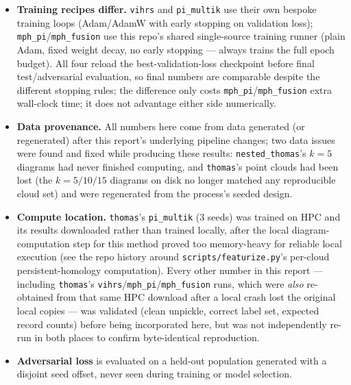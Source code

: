 \documentclass[11pt]{article}
\begin{document}
\begin{itemize}
  \item \textbf{Training recipes differ.} \texttt{vihrs} and \texttt{pi\_multik}
    use their own bespoke training loops (Adam/AdamW with early stopping on
    validation loss); \texttt{mph\_pi}/\texttt{mph\_fusion} use this repo's shared
    single-source training runner (plain Adam, fixed weight decay, no early
    stopping --- always trains the full epoch budget). All four reload the
    best-validation-loss checkpoint before final test/adversarial evaluation, so
    final numbers are comparable despite the different stopping rules; the
    difference only costs \texttt{mph\_pi}/\texttt{mph\_fusion} extra wall-clock
    time; it does not advantage either side numerically.
  \item \textbf{Data provenance.} All numbers here come from data generated (or
    regenerated) after this report's underlying pipeline changes; two data issues
    were found and fixed while producing these results: \texttt{nested\_thomas}'s
    $k=5$ diagrams had never finished computing, and \texttt{thomas}'s point
    clouds had been lost (the $k=5/10/15$ diagrams on disk no longer matched any
    reproducible cloud set) and were regenerated from the process's seeded design.
  \item \textbf{Compute location.} \texttt{thomas}'s \texttt{pi\_multik} (3
    seeds) was trained on HPC and its results downloaded rather than trained
    locally, after the local diagram-computation step for this method proved too
    memory-heavy for reliable local execution (see the repo history around
    \texttt{scripts/featurize.py}'s per-cloud persistent-homology computation).
    Every other number in this report --- including \texttt{thomas}'s
    \texttt{vihrs}/\texttt{mph\_pi}/\texttt{mph\_fusion} runs, which were
    \emph{also} re-obtained from that same HPC download after a local crash lost
    the original local copies --- was validated (clean unpickle, correct label
    set, expected record counts) before being incorporated here, but was not
    independently re-run in both places to confirm byte-identical reproduction.
  \item \textbf{Adversarial loss} is evaluated on a held-out population generated
    with a disjoint seed offset, never seen during training or model selection.
\end{itemize}
\end{document}
